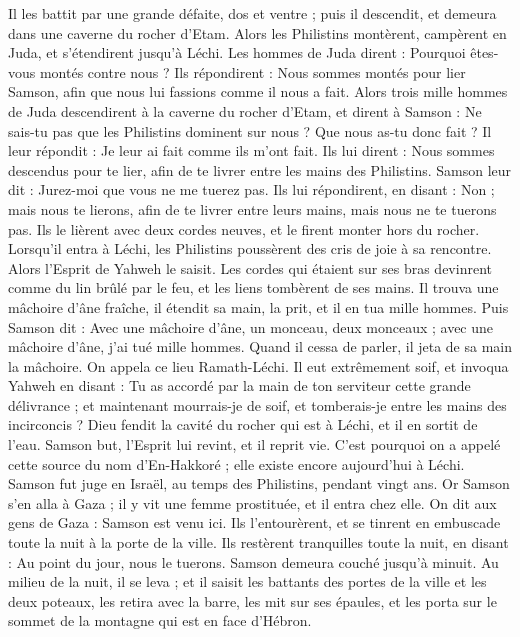 \begin{multicols}{2}
Il les battit par une grande défaite, dos et ventre ; puis il descendit, et demeura dans une caverne du rocher d'Etam.
Alors les Philistins montèrent, campèrent en Juda, et s'étendirent jusqu'à Léchi.
Les hommes de Juda dirent : Pourquoi êtes-vous montés contre nous ? Ils répondirent : Nous sommes montés pour lier Samson, afin que nous lui fassions comme il nous a fait.
Alors trois mille hommes de Juda descendirent à la caverne du rocher d'Etam, et dirent à Samson : Ne sais-tu pas que les Philistins dominent sur nous ? Que nous as-tu donc fait ? Il leur répondit : Je leur ai fait comme ils m'ont fait.
Ils lui dirent : Nous sommes descendus pour te lier, afin de te livrer entre les mains des Philistins. Samson leur dit : Jurez-moi que vous ne me tuerez pas.
Ils lui répondirent, en disant : Non ; mais nous te lierons, afin de te livrer entre leurs mains, mais nous ne te tuerons pas. Ils le lièrent avec deux cordes neuves, et le firent monter hors du rocher.
Lorsqu'il entra à Léchi, les Philistins poussèrent des cris de joie à sa rencontre. Alors l'Esprit de Yahweh le saisit. Les cordes qui étaient sur ses bras devinrent comme du lin brûlé par le feu, et les liens tombèrent de ses mains.
Il trouva une mâchoire d'âne fraîche, il étendit sa main, la prit, et il en tua mille hommes.
Puis Samson dit : Avec une mâchoire d'âne, un monceau, deux monceaux ; avec une mâchoire d'âne, j'ai tué mille hommes.
Quand il cessa de parler, il jeta de sa main la mâchoire. On appela ce lieu Ramath-Léchi.
Il eut extrêmement soif, et invoqua Yahweh en disant : Tu as accordé par la main de ton serviteur cette grande délivrance ; et maintenant mourrais-je de soif, et tomberais-je entre les mains des incirconcis ?
Dieu fendit la cavité du rocher qui est à Léchi, et il en sortit de l'eau. Samson but, l'Esprit lui revint, et il reprit vie. C'est pourquoi on a appelé cette source du nom d'En-Hakkoré ; elle existe encore aujourd'hui  à Léchi.
Samson fut juge en Israël, au temps des Philistins, pendant vingt ans.
\VerseOne{}Or Samson s'en alla à Gaza ; il y vit une femme prostituée, et il entra chez elle.
On dit aux gens de Gaza : Samson est venu ici. Ils l'entourèrent, et se tinrent en embuscade toute la nuit à la porte de la ville. Ils restèrent tranquilles toute la nuit, en disant : Au point du jour, nous le tuerons.
Samson demeura couché jusqu'à minuit. Au milieu de la nuit, il se leva ; et il saisit les battants des portes de la ville et les deux poteaux, les retira avec la barre, les mit sur ses épaules, et les porta sur le sommet de la montagne qui est en face d'Hébron.

\end{multicols}
